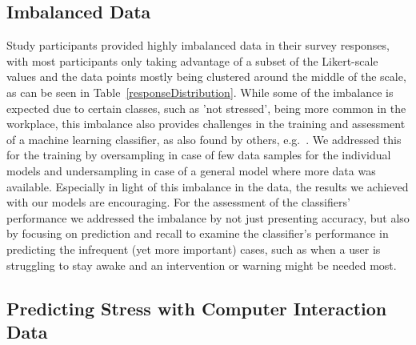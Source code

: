 \subsection{Imbalanced Data}

\vspace{-4mm}
Study participants provided highly
imbalanced data in their survey responses, with most participants only
taking advantage of a subset of the Likert-scale values and the data
points mostly being clustered around the middle of the scale, as can
be seen in Table~\ref{responseDistribution}. While some of the
imbalance is expected due to certain classes, such as 'not stressed',
being more common in the workplace, this imbalance also provides
challenges in the training and assessment of a machine learning
classifier, as also found by others, e.g.~\cite{Exler16}. We addressed
this for the training by oversampling in case of few data samples for
the individual models and undersampling in case of a general model
where more data was available. Especially in light of this imbalance
in the data, the results we achieved with our models are
encouraging. For the assessment of the classifiers' performance we
addressed the imbalance by not just presenting accuracy, but also by
focusing on prediction and recall to examine the classifier's
performance in predicting the infrequent (yet more important) cases,
such as when a user is struggling to stay awake and an intervention or
warning might be needed most.

\subsection{Predicting Stress with Computer Interaction Data}

